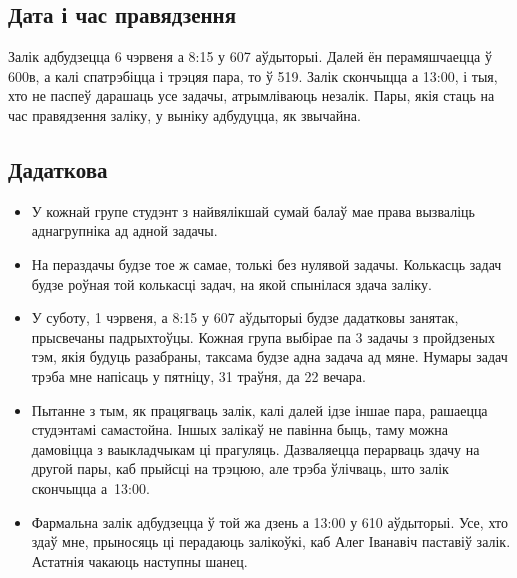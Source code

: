 \documentclass[12pt, a4paper]{extarticle}
\begin{document}
    \subsection{Дата і час правядзення}
    
    Залік адбудзецца 6 чэрвеня а 8:15 у 607 аўдыторыі. Далей ён перамяшчаецца ў 600в, а калі спатрэбіцца і трэцяя пара, то ў 519. Залік скончыцца а 13:00, і тыя, хто не паспеў дарашаць усе задачы, атрымліваюць незалік. Пары, якія стаць на час правядзення заліку, у выніку адбудуцца, як звычайна.

    \subsection{Дадаткова}
    
    \begin{itemize}
        \item У кожнай групе студэнт з найвялікшай сумай балаў мае права вызваліць аднагрупніка ад адной задачы.
        \item На пераздачы будзе тое ж самае, толькі без нулявой задачы. Колькасць задач будзе роўная той колькасці задач, на якой спынілася здача заліку.
        \item У суботу, 1 чэрвеня, а 8:15 у 607 аўдыторыі будзе дадатковы занятак, прысвечаны падрыхтоўцы. Кожная група выбірае па 3 задачы з пройдзеных тэм, якія будуць разабраны, таксама будзе адна задача ад мяне. Нумары задач трэба мне напісаць у пятніцу, 31 траўня, да 22 вечара.
        \item Пытанне з тым, як працягваць залік, калі далей ідзе іншае пара, рашаецца студэнтамі самастойна. Іншых залікаў не павінна быць, таму можна дамовіцца з ваыкладчыкам ці прагуляць. Дазваляецца перарваць здачу на другой пары, каб прыйсці на трэцюю, але трэба ўлічваць, што залік скончыцца а~13:00.
        \item Фармальна залік адбудзецца ў той жа дзень а 13:00 у 610 аўдыторыі. Усе, хто здаў мне, прыносяць ці перадаюць залікоўкі, каб Алег Іванавіч паставіў залік. Астатнія чакаюць наступны шанец.
    \end{itemize}
\end{document}
